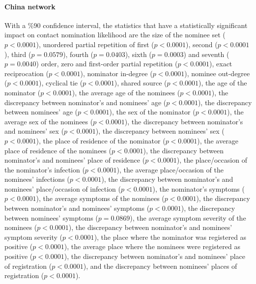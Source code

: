 \paragraph{China network} With a \%90 confidence interval, the statistics that have a statistically significant impact on contact nomination likelihood are the size of the nominee set ($p<0.0001$), unordered partial repetition of first ($p<0.0001$), second ($p<0.0001$), third ($p=0.0579$), fourth ($p=0.0403$), sixth ($p=0.0003$) and seventh ($p=0.0040$) order, zero and first-order partial repetition ($p<0.0001$), exact reciprocation ($p<0.0001$), nominator in-degree ($p<0.0001$), nominee out-degree ($p<0.0001$), cyclical tie ($p<0.0001$), shared source ($p<0.0001$), the age of the nominator ($p<0.0001$), the average age of the nominees ($p<0.0001$), the discrepancy between nominator's and nominees' age ($p<0.0001$), the discrepancy between nominees' age ($p<0.0001$), the sex of the nominator ($p<0.0001$), the average sex of the nominees ($p<0.0001$), the discrepancy between nominator's and nominees' sex ($p<0.0001$), the discrepancy between nominees' sex ($p<0.0001$), the place of residence of the nominator ($p<0.0001$), the average place of residence of the nominees ($p<0.0001$), the discrepancy between nominator's and nominees' place of residence ($p<0.0001$), the place/occasion of the nominator's infection ($p<0.0001$), the average place/occasion of the nominees' infections ($p<0.0001$), the discrepancy between nominator's and nominees' place/occasion of infection ($p<0.0001$), the nominator's symptoms ($p<0.0001$), the average symptoms of the nominees ($p<0.0001$), the discrepancy between nominator's and nominees' symptoms ($p<0.0001$), the discrepancy between nominees' symptoms ($p=0.0869$), the average symptom severity of the nominees ($p<0.0001$), the discrepancy between nominator's and nominees' symptom severity ($p<0.0001$), the place where the nominator was registered as positive ($p<0.0001$), the average place where the nominees were registered as positive ($p<0.0001$), the discrepancy between nominator's and nominees' place of registration ($p<0.0001$), and the discrepancy between nominees' places of registration ($p<0.0001$). 

